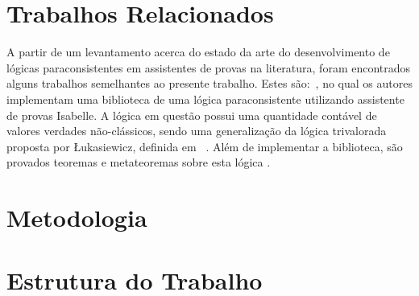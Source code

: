     \section{Trabalhos Relacionados}
    A partir de um levantamento acerca do estado da arte do desenvolvimento de lógicas paraconsistentes em assistentes de provas na literatura, foram encontrados alguns trabalhos semelhantes ao presente trabalho. Estes são:~\cite{Villadsen2017}, no qual os autores implementam uma biblioteca de uma lógica paraconsistente utilizando assistente de provas Isabelle. A lógica em questão possui uma quantidade  contável de valores verdades não-clássicos, sendo uma generalização da lógica trivalorada proposta por {\L}ukasiewicz,  definida em~\cite{sep-lukasiewicz} . Além de implementar a biblioteca, são provados teoremas e metateoremas sobre esta lógica .


    \section{Metodologia}
        

    \section{Estrutura do Trabalho}
       